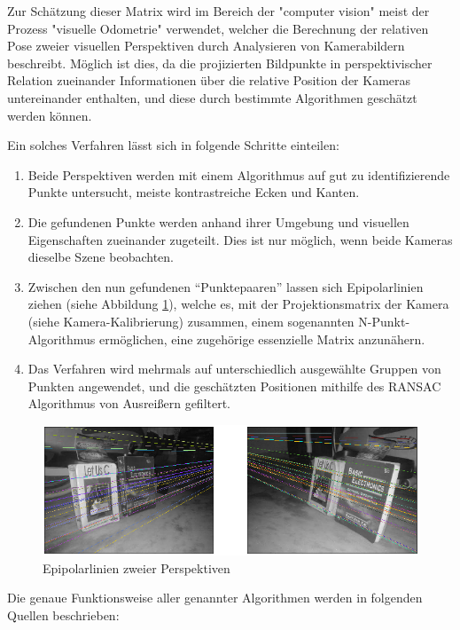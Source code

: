 \documentclass[12pt, ngerman]{article}
\begin{document}
Zur Schätzung dieser Matrix wird im Bereich der "computer vision" meist der Prozess "visuelle Odometrie" verwendet, welcher die Berechnung der relativen Pose zweier visuellen Perspektiven durch Analysieren von Kamerabildern beschreibt. Möglich ist dies, da die projizierten Bildpunkte in perspektivischer Relation zueinander Informationen über die relative Position der Kameras untereinander enthalten, und diese durch bestimmte Algorithmen geschätzt werden können.

Ein solches Verfahren lässt sich in folgende Schritte einteilen:

\begin{enumerate}
  \item Beide Perspektiven werden mit einem Algorithmus auf gut zu identifizierende Punkte untersucht, meiste kontrastreiche Ecken und Kanten.
  \item Die gefundenen Punkte werden anhand ihrer Umgebung und visuellen Eigenschaften zueinander zugeteilt. Dies ist nur möglich, wenn beide Kameras dieselbe Szene beobachten.
  \item Zwischen den nun gefundenen ``Punktepaaren'' lassen sich
  Epipolarlinien ziehen (siehe Abbildung \ref{Abb: epipolar}), welche es, mit der Projektionsmatrix der Kamera (siehe
  Kamera-Kalibrierung) zusammen, einem sogenannten N-Punkt-Algorithmus
  ermöglichen, eine zugehörige essenzielle Matrix anzunähern.
  \item Das Verfahren wird mehrmals auf unterschiedlich ausgewählte Gruppen
  von Punkten angewendet, und die geschätzten Positionen mithilfe des RANSAC
  Algorithmus von Ausreißern gefiltert.
\end{enumerate}

\begin{figure}[hbtp!]
    \includegraphics[width=\textwidth]{epipolar_2.png}
    \caption{Epipolarlinien zweier Perspektiven}
    \label{Abb: epipolar}
\end{figure}

Die genaue Funktionsweise aller genannter Algorithmen werden in folgenden Quellen beschrieben: 
\end{document}
